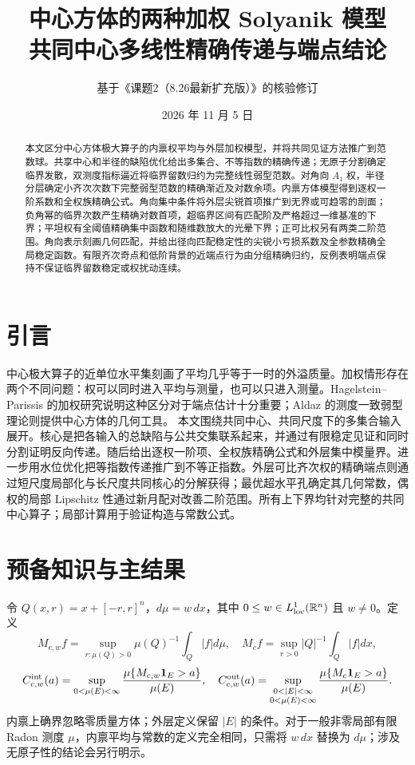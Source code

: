 \documentclass[UTF8,11pt,fontset=none]{ctexart}
\title{中心方体的两种加权 Solyanik 模型\\共同中心多线性精确传递与端点结论}
\author{基于《课题2（8.26最新扩充版）》的核验修订}\date{2026 年 11 月 5 日}
\theoremstyle{definition}\newtheorem{theorem}{定理}[section]\newtheorem{lemma}[theorem]{引理}\newtheorem{corollary}[theorem]{推论}\newtheorem{proposition}[theorem]{命题}
\theoremstyle{remark}\newtheorem{remark}[theorem]{说明}
\newcommand{\R}{\mathbb R}\newcommand{\1}{\mathbf 1}
\begin{document}
\maketitle
\begin{abstract}本文区分中心方体极大算子的内禀权平均与外层加权模型，并将共同见证方法推广到范数球。共享中心和半径的缺陷优化给出多集合、不等指数的精确传递；无原子分割确定临界发散，双测度指标逼近将临界留数归约为完整线性弱型范数。对角向 $A_1$ 权，半径分层确定小齐次次数下完整弱型范数的精确渐近及对数余项。内禀方体模型得到逐权一阶系数和全权族精确公式。角向集中条件将外层尖锐首项推广到无界或可趋零的剖面；负角幂的临界次数产生精确对数首项，超临界区间有匹配阶及严格超过一维基准的下界；平坦权有全阈值精确集中函数和随维数放大的光晕下界；正可比权另有两类二阶范围。角向表示刻画几何匹配，并给出径向匹配稳定性的尖锐小亏损系数及全参数精确全局稳定函数。有限齐次奇点和低阶背景的近端点行为由分组精确归约，反例表明端点保持不保证临界留数稳定或权扰动连续。\end{abstract}

\section{引言}
中心极大算子的近单位水平集刻画了平均几乎等于一时的外溢质量。加权情形存在两个不同问题：权可以同时进入平均与测量，也可以只进入测量。Hagelstein--Parissis 的加权研究说明这种区分对于端点估计十分重要\cite{HagelsteinParissis2016}；Aldaz 的测度一致弱型理论则提供中心方体的几何工具\cite{Aldaz2020}。
本文围绕共同中心、共同尺度下的多集合输入展开。核心是把各输入的总缺陷与公共交集联系起来，并通过有限稳定见证和同时分割证明反向传递。随后给出逐权一阶项、全权族精确公式和外层集中模量界。进一步用水位优化把等指数传递推广到不等正指数。外层可比齐次权的精确端点则通过短尺度局部化与长尺度共同核心的分解获得；最优超水平孔确定其几何常数，偶权的局部 Lipschitz 性通过新月配对改善二阶范围。所有上下界均针对完整的共同中心算子；局部计算用于验证构造与常数公式。
\section{预备知识与主结果}
令 $Q(x,r)=x+[-r,r]^n$，$d\mu=w\,dx$，其中 $0\le w\in L^1_{\rm loc}(\R^n)$ 且 $w\ne0$。定义
\[
 M_{c,w}f=\sup_{r:\mu(Q)>0}\mu(Q)^{-1}\int_Q|f|d\mu,\quad
 M_cf=\sup_{r>0}|Q|^{-1}\int_Q|f|dx,
\]
\[
 C_{c,w}^{\rm int}(a)=\sup_{0<\mu(E)<\infty}\frac{\mu\{M_{c,w}\1_E>a\}}{\mu(E)},\quad
 C_{c,w}^{\rm out}(a)=\sup_{\substack{0<|E|<\infty\\0<\mu(E)<\infty}}\frac{\mu\{M_c\1_E>a\}}{\mu(E)}.
\]
内禀上确界忽略零质量方体；外层定义保留 $|E|$ 的条件。对于一般非零局部有限 Radon 测度 $\mu$，内禀平均与常数的定义完全相同，只需将 $w\,dx$ 替换为 $d\mu$；涉及无原子性的结论会另行明示。
\end{document}
